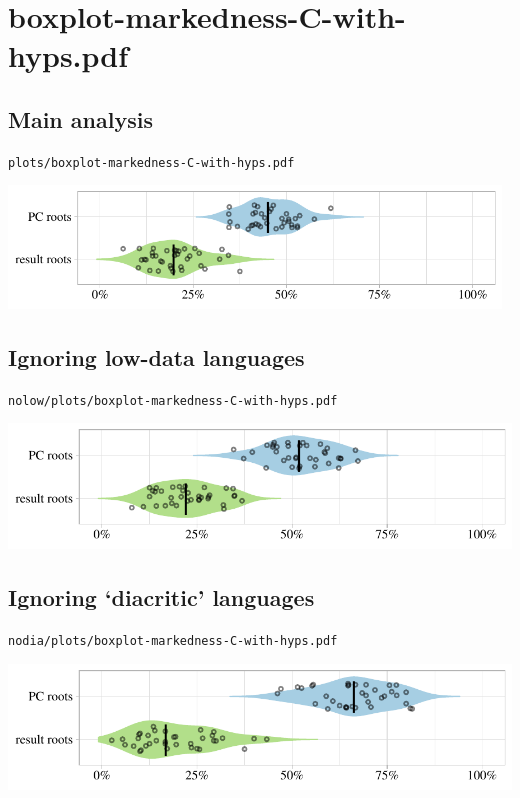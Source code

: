 \eject

\section{boxplot-markedness-C-with-hyps.pdf}

\subsection{Main analysis}

\texttt{plots/boxplot-markedness-C-with-hyps.pdf}

\includegraphics[width=0.98\textwidth]{../plots/boxplot-markedness-C-with-hyps.pdf}

\subsection{Ignoring low-data languages}

\texttt{nolow/plots/boxplot-markedness-C-with-hyps.pdf}

\includegraphics[width=1.0\textwidth]{../nolow/plots/boxplot-markedness-C-with-hyps.pdf}

\subsection{Ignoring `diacritic' languages}

\texttt{nodia/plots/boxplot-markedness-C-with-hyps.pdf}

\includegraphics[width=1.0\textwidth]{../nodia/plots/boxplot-markedness-C-with-hyps.pdf}

